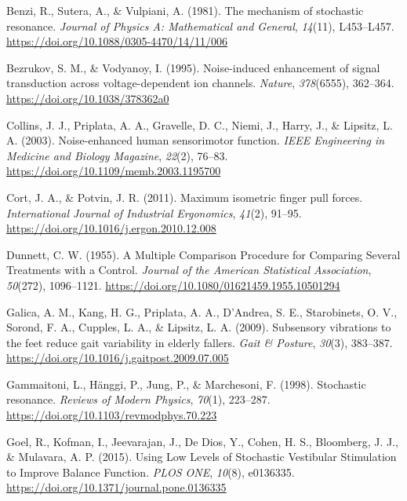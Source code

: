 \documentclass[]{cik}%
\newlength{\cslhangindent}
\newlength{\cslentryspacingunit} %
\newenvironment{CSLReferences}[2] %
 {%
  \setlength{\parindent}{0pt}
  \ifodd #1
  \let\oldpar\par
  \def\par{\hangindent=\cslhangindent\oldpar}
  \fi
  \setlength{\parskip}{#2\cslentryspacingunit}
 }%
 {}
\begin{document}
\hypertarget{refs}{}
\begin{CSLReferences}{1}{0}
\leavevmode{}%
Benzi, R., Sutera, A., \& Vulpiani, A. (1981). The mechanism of
stochastic resonance. \emph{Journal of Physics A: Mathematical and
General}, \emph{14}(11), L453--L457.
\url{https://doi.org/10.1088/0305-4470/14/11/006}

\leavevmode{}%
Bezrukov, S. M., \& Vodyanoy, I. (1995). Noise-induced enhancement of
signal transduction across voltage-dependent ion channels.
\emph{Nature}, \emph{378}(6555), 362--364.
\url{https://doi.org/10.1038/378362a0}

\leavevmode{}%
Collins, J. J., Priplata, A. A., Gravelle, D. C., Niemi, J., Harry, J.,
\& Lipsitz, L. A. (2003). Noise-enhanced human sensorimotor function.
\emph{IEEE Engineering in Medicine and Biology Magazine}, \emph{22}(2),
76--83. \url{https://doi.org/10.1109/memb.2003.1195700}

\leavevmode{}%
Cort, J. A., \& Potvin, J. R. (2011). Maximum isometric finger pull
forces. \emph{International Journal of Industrial Ergonomics},
\emph{41}(2), 91--95. \url{https://doi.org/10.1016/j.ergon.2010.12.008}

\leavevmode{}%
Dunnett, C. W. (1955). A Multiple Comparison Procedure for Comparing
Several Treatments with a Control. \emph{Journal of the American
Statistical Association}, \emph{50}(272), 1096--1121.
\url{https://doi.org/10.1080/01621459.1955.10501294}

\leavevmode{}%
Galica, A. M., Kang, H. G., Priplata, A. A., D'Andrea, S. E.,
Starobinets, O. V., Sorond, F. A., Cupples, L. A., \& Lipsitz, L. A.
(2009). Subsensory vibrations to the feet reduce gait variability in
elderly fallers. \emph{Gait \& Posture}, \emph{30}(3), 383--387.
\url{https://doi.org/10.1016/j.gaitpost.2009.07.005}

\leavevmode{}%
Gammaitoni, L., Hänggi, P., Jung, P., \& Marchesoni, F. (1998).
Stochastic resonance. \emph{Reviews of Modern Physics}, \emph{70}(1),
223--287. \url{https://doi.org/10.1103/revmodphys.70.223}

\leavevmode{}%
Goel, R., Kofman, I., Jeevarajan, J., De Dios, Y., Cohen, H. S.,
Bloomberg, J. J., \& Mulavara, A. P. (2015). Using Low Levels of
Stochastic Vestibular Stimulation to Improve Balance Function.
\emph{PLOS ONE}, \emph{10}(8), e0136335.
\url{https://doi.org/10.1371/journal.pone.0136335}


\end{CSLReferences}
\end{document}
